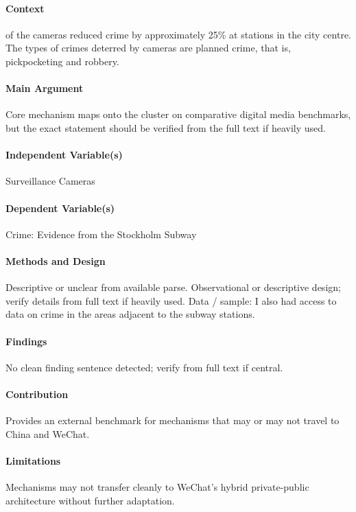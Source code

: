 \documentclass[12pt]{article}
\begin{document}
\paragraph{Context} of the cameras reduced crime by approximately 25\% at stations in the city centre. The types of crimes deterred by cameras are planned crime, that is, pickpocketing and robbery.

\paragraph{Main Argument} Core mechanism maps onto the cluster on comparative digital media benchmarks, but the exact statement should be verified from the full text if heavily used.

\paragraph{Independent Variable(s)} Surveillance Cameras

\paragraph{Dependent Variable(s)} Crime: Evidence from the Stockholm Subway

\paragraph{Methods and Design} Descriptive or unclear from available parse. Observational or descriptive design; verify details from full text if heavily used. Data / sample: I also had access to data on crime in the areas adjacent to the subway stations.

\paragraph{Findings} No clean finding sentence detected; verify from full text if central.

\paragraph{Contribution} Provides an external benchmark for mechanisms that may or may not travel to China and WeChat.

\paragraph{Limitations} Mechanisms may not transfer cleanly to WeChat's hybrid private-public architecture without further adaptation.
\end{document}
